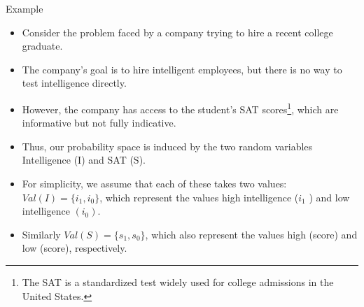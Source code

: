 \documentclass[handout]{beamer}
\begin{document}
\begin{frame}{Example}
\scriptsize{
\begin{itemize}


\item Consider the problem faced by a company trying to hire a recent college graduate. 
\item The company's goal is to hire intelligent employees, but there is no way to test intelligence directly. 

\item However, the company has access to the student's SAT scores\footnote{The SAT is a standardized test widely used for college admissions in the United States.}, which are informative but not fully indicative. 

\item Thus, our probability space is induced by the two random variables Intelligence (I) and SAT (S). 
\item For simplicity, we assume that each of these takes two values: $Val(I) = \{i_1 , i_0 \}$, which represent
the values high intelligence ($i_1$ ) and low intelligence $(i_0)$.
\item Similarly $Val(S) = \{s_1 , s_0 \}$, which
also represent the values high (score) and low (score), respectively.

\end{itemize}



} 

\end{frame}
\end{document}
